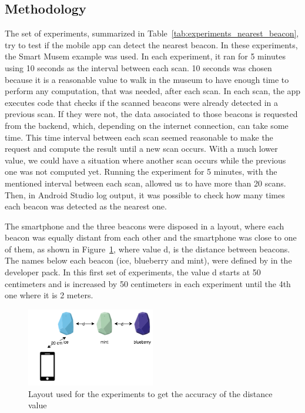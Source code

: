 \subsection{Methodology}
\label{sub:evaluation_nearest_beacon_methodology}
The set of experiments, summarized in Table~\ref{tab:experiments_nearest_beacon}, try to test if the mobile app can detect the nearest beacon.
In these experiments, the Smart Musem example was used.
In each experiment, it ran for 5 minutes using 10 seconds as the interval between each scan.
10 seconds was chosen because it is a reasonable value to walk in the museum to have enough time to perform any computation, that was needed, after each scan.
In each scan, the app executes code that checks if the scanned beacons were already detected in a previous scan. If they were not, the data associated to those beacons is requested from the backend, which, depending on the internet connection, can take some time.
This time interval between each scan seemed reasonable to make the request and compute the result until a new scan occurs.
With a much lower value, we could have a situation where another scan occurs while the previous one was not computed yet.
Running the experiment for 5 minutes, with the mentioned interval between each scan, allowed us to have more than 20 scans.
Then, in Android Studio log output, it was possible to check how many times each beacon was detected as the nearest one.

The smartphone and the three beacons were disposed in a layout, where each beacon was equally distant from each other and the smartphone was close to one of them, as shown in Figure~\ref{fig:layout_experiments_nearest_beacon}, where value d, is the distance between beacons.
The names below each beacon (ice, blueberry and mint), were defined by  in
the developer pack.
In this first set of experiments, the value d starts at 50 centimeters and is increased by 50 centimeters in each experiment until the 4th one where it is 2 meters.



\begin{figure}[!ht]
  \centering
    \includegraphics[width=0.5\textwidth, keepaspectratio]{images/nearest_beacon}
    \caption[Layout for experiments of nearest beacon]{Layout used for the experiments to get the accuracy of the distance value}
    \label{fig:layout_experiments_nearest_beacon}
\end{figure}


